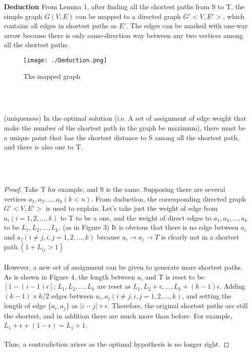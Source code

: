 \documentclass{elegantpaper}
\begin{document}
\textbf{Deduction}	\quad From Lemma 1, after finding all the shortest paths from S to T, the simple graph $G(V,E)$ can be mapped to a directed graph $G'<V,E'>$, which contains all edges in shortest paths as $E'$. The edges can be marked with one-way arrow because there is only same-direction way between any two vertices among all the shortest paths.
\begin{figure}[htbp]
	
	\centering
	
	\texttt{[image: ./Deduction.png]}
	
	\caption{The mapped graph}
	
\end{figure}
\\ \hspace*{\fill} \\
\begin{lemma}  
(uniqueness)	\quad In the optimal solution (i.e. A set of  assignment of edge weight that make the number of the shortest path in the graph be maximum), there must be a unique point that has the shortest distance to S among all the shortest path, and there is also one to T.

\\ \hspace*{\fill} \\
\end{lemma}
\begin{proof}	\quad Take T for example, and S is the same. Supposing there are several vertices $a_{1}, a_{2},...,a_{k}(k<n)$. From duduction, the corresponding directed graph $G'<V,E'>$ is used to explain. Let's take just the weight of edge from $a_{i}(i=1,2,...,k)$ to T to be a one, and the weight of direct edges to $a_{1}, a_{2},...,a_{k}$ to be $L_{1}, L_{2},...,L_{k}$. (as in Figure 3) It is obvious that there is no edge between $a_{i}$ and $a_{j} (i\ne j,i,j = 1,2,...,k)$ because $a_{i}\rightarrow a_{j}\rightarrow T$ is clearly not in a shortest path.$(1+L_{ij} > 1)$
\\ \hspace*{\fill} \\
However, a new set of assignment can be given to generate more shortest paths.
As is shown in Figure 4, the length between $a_{i}$ and T is reset to be $[1-(i-1)\epsilon] $; $L_{1}, L_{2},...,L_{k}$ are reset as $L_{1}, L_{2}+\epsilon,...,L_{k}+(k-1)\epsilon$. Adding $(k-1)\times k/2$ edges between $a_{i}, a_{j}(i\ne j,i,j = 1,2,...,k)$, and setting the length of edge $\{a_{i}, a_{j}\}$ as $|i-j|\times \epsilon$. Therefore, the original shortest paths are still the shortest, and in addition there are much more than before. For example, $L_{1}+\epsilon + (1-\epsilon) = L_{1}+1$.
\\ \hspace*{\fill} \\
Thus, a contradiction arises as the optimal hypothesis is no longer right.
\end{proof}
\end{document}
